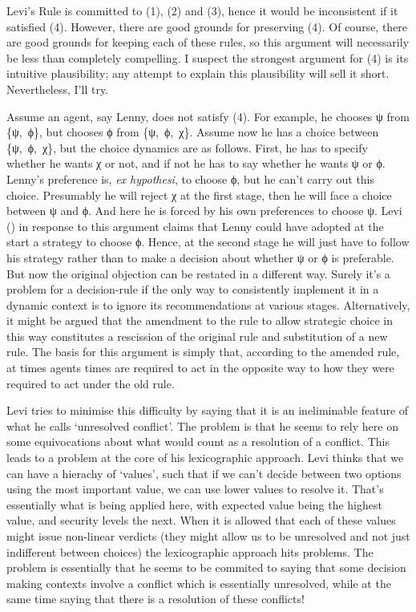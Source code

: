 \documentclass[
  11pt,
  letterpaper,
  DIV=11,
  numbers=noendperiod,
  twoside]{scrartcl}
\begin{document}
Levi's Rule is committed to (1), (2) and (3), hence it would be
inconsistent if it satisfied (4). However, there are good grounds for
preserving (4). Of course, there are good grounds for keeping each of
these rules, so this argument will necessarily be less than completely
compelling. I suspect the strongest argument for (4) is its intuitive
plausibility; any attempt to explain this plausibility will sell it
short. Nevertheless, I'll try.

Assume an agent, say Lenny, does not satisfy (4). For example, he
chooses ψ from \{ψ,~ϕ\}, but chooses ϕ from \{ψ,~ϕ,~χ\}. Assume now he
has a choice between \{ψ,~ϕ,~χ\}, but the choice dynamics are as
follows. First, he has to specify whether he wants χ or not, and if not
he has to say whether he wants ψ or ϕ. Lenny's preference is, \emph{ex
hypothesi}, to choose ϕ, but he can't carry out this choice. Presumably
he will reject χ at the first stage, then he will face a choice between
ψ and ϕ. And here he is forced by his own preferences to choose ψ. Levi
() in response to this argument claims that
Lenny could have adopted at the start a strategy to choose ϕ. Hence, at
the second stage he will just have to follow his strategy rather than to
make a decision about whether ψ or ϕ is preferable. But now the original
objection can be restated in a different way. Surely it's a problem for
a decision-rule if the only way to consistently implement it in a
dynamic context is to ignore its recommendations at various stages.
Alternatively, it might be argued that the amendment to the rule to
allow strategic choice in this way constitutes a rescission of the
original rule and substitution of a new rule. The basis for this
argument is simply that, according to the amended rule, at times agents
times are required to act in the opposite way to how they were required
to act under the old rule.

Levi tries to minimise this difficulty by saying that it is an
ineliminable feature of what he calls `unresolved conflict'. The problem
is that he seems to rely here on some equivocations about what would
count as a resolution of a conflict. This leads to a problem at the core
of his lexicographic approach. Levi thinks that we can have a hierachy
of `values', such that if we can't decide between two options using the
most important value, we can use lower values to resolve it. That's
essentially what is being applied here, with expected value being the
highest value, and security levels the next. When it is allowed that
each of these values might issue non-linear verdicts (they might allow
us to be unresolved and not just indifferent between choices) the
lexicographic approach hits problems. The problem is essentially that he
seems to be commited to saying that some decision making contexts
involve a conflict which is essentially unresolved, while at the same
time saying that there is a resolution of these conflicts!
\end{document}
